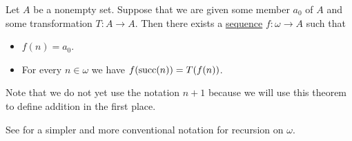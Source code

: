 \begin{theorem}\label{thm:omega_recursion}
  Let \( A \) be a nonempty set. Suppose that we are given some member \( a_0 \) of \( A \) and some transformation \( T: A \to A \). Then there exists a \hyperref[def:sequence]{sequence} \( f: \omega \to A \) such that
  \begin{itemize}
    \item \( f(n) = a_0 \).
    \item For every \( n \in \omega \) we have \( f(\operatorname{succ}(n)) = T(f(n)) \).
  \end{itemize}

  Note that we do not yet use the notation \( n + 1 \) because we will use this theorem to define addition in the first place.

  See  for a simpler and more conventional notation for recursion on \( \omega \).
\end{theorem}
